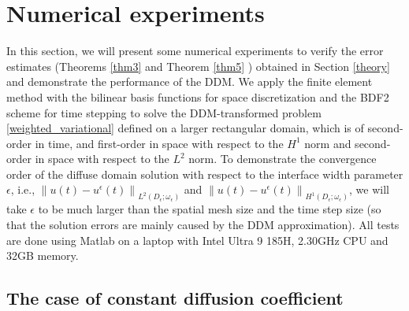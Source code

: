 \documentclass[3p,times]{elsarticle}
\numberwithin{equation}{section}
\begin{document}
	
	

\section{Numerical experiments}\label{numerical}

In this section, we will present some numerical experiments to verify the error estimates (Theorems \ref{thm3}  and Theorem \ref{thm5} ) obtained in Section \ref{theory} and demonstrate the performance of the DDM. We apply the finite element method with the bilinear basis functions  for space discretization and  the BDF2 scheme for time stepping to solve the 
DDM-transformed problem \eqref{weighted_variational} defined on a larger rectangular domain, which is of second-order  in time, and first-order  in space with respect to the $H^1$ norm and second-order  in space with respect to the $L^2$ norm.
To demonstrate  the convergence order of the diffuse domain solution with respect to the interface width parameter $\epsilon$, i.e., $\left\|u(t)-u^{\epsilon}(t)\right\|_{L^2(D_{\epsilon};\omega_{\epsilon})}$ and $\left\|u(t)-u^{\epsilon}(t)\right\|_{H^1(D_{\epsilon};\omega_{\epsilon})}$, we will
take  $\epsilon$ to be much larger than the spatial mesh size and the time step size (so that the solution errors are mainly caused by the DDM approximation). All tests are done using Matlab on a laptop with Intel Ultra 9 185H, 2.30GHz CPU and 32GB memory. 


\subsection{The case of constant diffusion coefficient}

\end{document}
